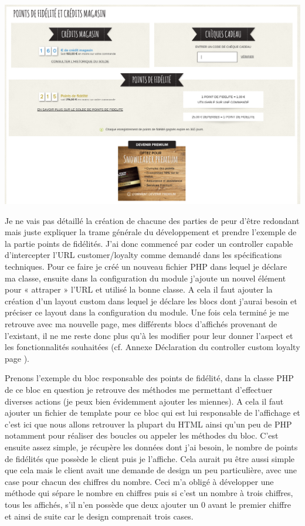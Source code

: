\documentclass[a4paper,11pt,twoside]{report}
\begin{document}
	\begin{center}
	  \includegraphics[width=\textwidth]{images/SL_loyalty_page1.png} 
	  \label{SL_loyalty_page1}
	\end{center}
	
    	Je ne vais pas détaillé la création de chacune des parties de peur d'être redondant mais juste expliquer la trame générale du développement et prendre l'exemple de la partie points de fidélités. J'ai donc commencé par coder un controller capable d'intercepter l'URL customer/loyalty comme demandé dans les spécifications techniques. Pour ce faire je créé un nouveau fichier PHP dans lequel je déclare ma classe, ensuite dans la configuration du module j'ajoute un nouvel élément pour  « attraper » l'URL et utilisé la bonne classe. A cela il faut ajouter la création d'un layout custom dans lequel je déclare les blocs dont j'aurai besoin et préciser ce layout dans la configuration du module. Une fois cela terminé je me retrouve avec ma nouvelle page, mes différents blocs d'affichés provenant de l'existant, il ne me reste donc plus qu'à les modifier pour leur donner l'aspect et les fonctionnalités souhaitées (cf. Annexe Déclaration du controller custom loyalty page \pageref{SL_loyalty_controller}).
	
	Prenons l'exemple du bloc responsable des points de fidélité, dans la classe PHP de ce bloc en question je retrouve des méthodes me permettant d'effectuer diverses actions (je peux bien évidemment ajouter les miennes). A cela il faut ajouter un fichier de template pour ce bloc qui est lui responsable de l'affichage et c'est ici que nous allons retrouver la plupart du HTML ainsi qu'un peu de PHP notamment pour réaliser des boucles ou appeler les méthodes du bloc. C'est ensuite assez simple, je récupère les données dont j'ai besoin, le nombre de points de fidélités que possède le client puis je l'affiche. Cela aurait pu être aussi simple que cela mais le client avait une demande de design un peu particulière, avec une case pour chacun des chiffres du nombre. Ceci m'a obligé à développer une méthode qui sépare le nombre en chiffres puis si c'est un nombre à trois chiffres, tous les affichés, s'il n'en possède que deux ajouter un 0 avant le premier chiffre et ainsi de suite car le design comprenait trois cases.
    
\end{document}
